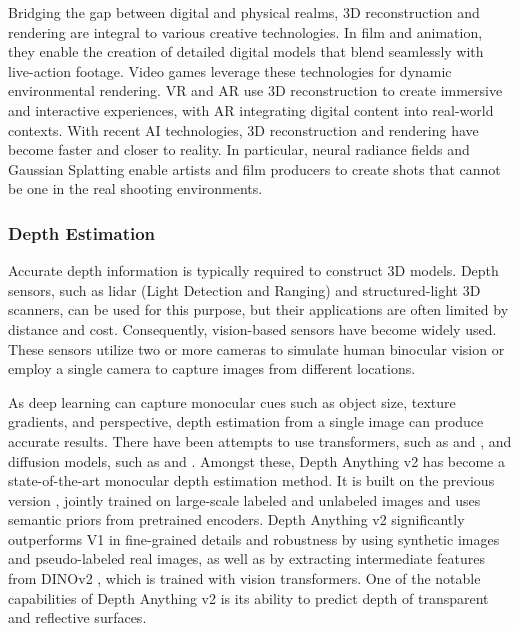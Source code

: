 \documentclass[11pt,a4paper]{article}
\begin{document}
Bridging the gap between digital and physical realms, 3D reconstruction and rendering are integral to various creative technologies.  In film and animation, they enable the creation of detailed digital models that blend seamlessly with live-action footage. Video games leverage these technologies for dynamic environmental rendering. VR and AR use 3D reconstruction to create immersive and interactive experiences, with AR integrating digital content into real-world contexts. With recent AI technologies, 3D reconstruction and rendering have become faster and closer to reality. In particular, neural radiance fields and Gaussian Splatting enable artists and film producers to create shots that cannot be one in the real shooting environments.

\subsubsection{Depth Estimation}
\label{sssec:depth}

Accurate depth information is typically required to construct 3D models. Depth sensors, such as lidar (Light Detection and Ranging) and structured-light 3D scanners, can be used for this purpose, but their applications are often limited by distance and cost. Consequently, vision-based sensors have become widely used. These sensors utilize two or more cameras to simulate human binocular vision or employ a single camera to capture images from different locations.

As deep learning can capture monocular cues such as object size, texture gradients, and perspective, depth estimation from a single image can produce accurate results. There have been attempts to use transformers, such as \cite{Zhang:Lite:2023} and \cite{Chen:Vision:2023}, and diffusion models, such as \cite{Ji:DDP:2023} and \cite{Ke:Repurposing:2024}. Amongst these, Depth Anything v2 \cite{Yang:depthanythingv2:2024} has become a state-of-the-art monocular depth estimation method. It is built on the previous version \cite{Yang:depthanything:2024}, jointly trained on large-scale labeled and unlabeled images and uses semantic priors from pretrained encoders. Depth Anything v2 significantly outperforms V1 in fine-grained details and robustness by using synthetic images and pseudo-labeled real images, as well as by extracting intermediate features from DINOv2 \cite{Oquab:DINOv2:2024}, which is trained with vision transformers. One of the notable capabilities of Depth Anything v2 is its ability to predict depth of transparent and reflective surfaces.
\end{document}
